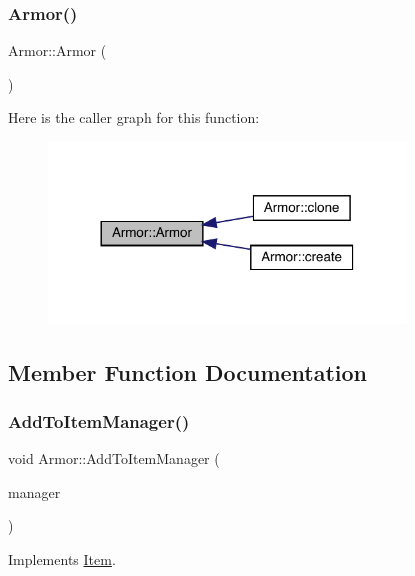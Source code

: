 \subsubsection{\texorpdfstring{Armor()}{Armor()}\hspace{0.1cm}{\footnotesize\ttfamily [3/3]}}
{\footnotesize\ttfamily Armor\+::\+Armor (\begin{DoxyParamCaption}{ }\end{DoxyParamCaption})}

Here is the caller graph for this function\+:
\nopagebreak
\begin{figure}[H]
\begin{center}
\leavevmode
\includegraphics[width=269pt]{d9/d76/class_armor_a23323e95bbeb488eb6fe54cbd83d49a2_icgraph}
\end{center}
\end{figure}


\subsection{Member Function Documentation}
\mbox{\label{class_armor_a008a9def7f07c141c87771937d856616}} 
\subsubsection{\texorpdfstring{Add\+To\+Item\+Manager()}{AddToItemManager()}}
{\footnotesize\ttfamily void Armor\+::\+Add\+To\+Item\+Manager (\begin{DoxyParamCaption}\item[{\mbox{\hyperlink{class_item_manager}{Item\+Manager}} \&}]{manager }\end{DoxyParamCaption})\hspace{0.3cm}{\ttfamily [virtual]}}



Implements \mbox{\hyperlink{class_item_ae534538f3e77078f804acc742ef68521}{Item}}.

